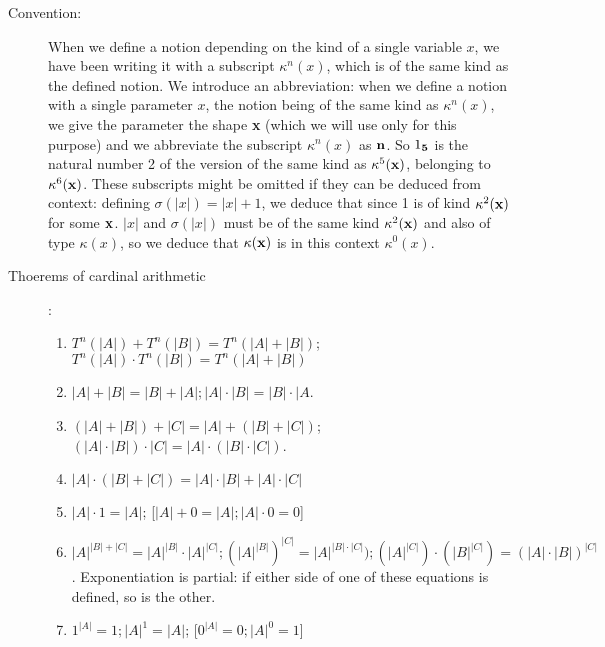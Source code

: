 \documentclass[12pt]{article}
\begin{document}
\begin{description}

\item[Convention:]  When we define a notion depending on the kind of a single variable $x$, we have been writing it with a subscript $\kappa^n(x)$, which is of the same kind as the defined notion.  We introduce an abbreviation:
when we define a notion with a single parameter $x$, the notion being of the same kind as $\kappa^n(x)$, we give the parameter the shape {\bf x} (which we will use only for this purpose) and we abbreviate the subscript ${\kappa^n(x)}$ as ${\bf n}$.   So $1_{\bf 5}$ is the natural number 2 of the version of the same kind as $\kappa^5({\bf x})$, belonging to $\kappa^6({\bf x})$.  These subscripts might be omitted if they can be deduced from context:
defining $\sigma(|x|)=|x|+1$, we deduce that since 1 is of kind $\kappa^2({\bf x})$ for some ${\bf x}$. $|x|$ and $\sigma(|x|)$ must be of the same kind $\kappa^2({\bf x})$ and also of type $\kappa(x)$, so we deduce that
$\kappa({\bf x})$ is in this context $\kappa^0(x)$.

\item[Thoerems of cardinal arithmetic]:\newline

\begin{enumerate}

\item $T^n(|A|)+T^n(|B|) = T^n(|A|+|B|)$;  $T^n(|A|)\cdot T^n(|B|) = T^n(|A|+|B|)$

\item $|A|+|B|= |B|+|A|; |A|\cdot |B| = |B|\cdot |A$.

\item $(|A|+|B|)+|C| = |A|+(|B|+|C|)$;  $(|A|\cdot|B|)\cdot |C| = |A|\cdot(|B|\cdot|C|)$.

\item $|A|\cdot(|B|+|C|) = |A|\cdot|B|+|A|\cdot|C|$

\item$|A|\cdot 1 = |A|$; [$|A|+0=|A|; |A|\cdot 0 = 0$]

\item$|A|^{|B|+|C|} = |A|^{|B|}\cdot |A|^{|C|};  (|A|^{|B|})^{|C|} = |A|^{|B|\cdot |C|});  (|A|^{|C|})\cdot(|B|^{|C|}) = (|A|\cdot {|B|})^{{|C|}}$.  Exponentiation is partial:  if either side of one of these equations is defined, so is the other.

\item $1^{|A|} = 1;  |A|^1=|A|$; [$0^{|A|}= 0; |A|^0=1$]


\end{enumerate}
\end{description}
\end{document}

